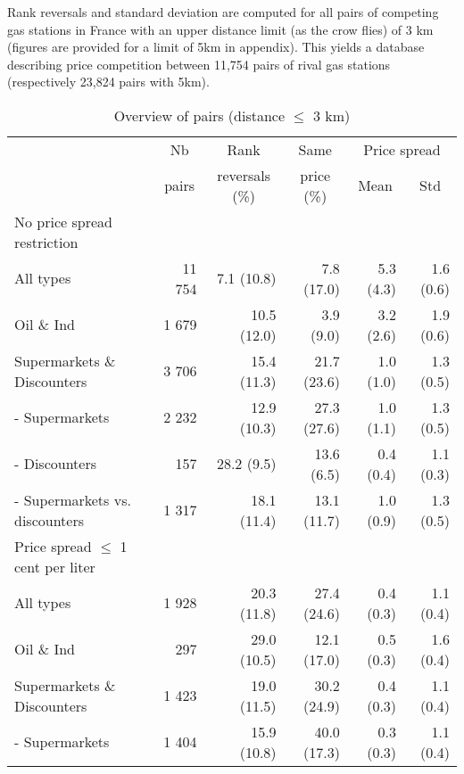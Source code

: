\documentclass[english]{article}
\begin{document}
Rank reversals and standard deviation are computed for all pairs of competing gas stations in France with an upper distance limit (as the crow flies) of 3 km (figures are provided for a limit of 5km in appendix). This yields a database describing price competition between 11,754 pairs of rival gas stations (respectively 23,824 pairs with 5km).

\begin{table}
\begin{threeparttable}
\renewcommand{\arraystretch}{0.8} %
\caption{Overview of pairs (distance $\le$ 3 km)}
\label{tab:stats_pair_rank_reversals}
    \begin{tabular}{lrrrrr}
    \toprule
    \toprule
          & \multicolumn{1}{c}{Nb} & \multicolumn{1}{c}{Rank} & \multicolumn{1}{c}{Same} & \multicolumn{2}{c}{Price spread} \\
          & \multicolumn{1}{c}{pairs} & \multicolumn{1}{c}{reversals (\%)} & \multicolumn{1}{c}{price (\%)} & \multicolumn{1}{c}{Mean} & \multicolumn{1}{c}{Std} \\
    \midrule
    No price spread restriction &       &       &       &       &  \\
    All types & 11 754 & 7.1 (10.8) & 7.8 (17.0) & 5.3 (4.3) & 1.6 (0.6) \\
    Oil \& Ind & 1 679 & 10.5 (12.0) & 3.9  (9.0) & 3.2 (2.6) & 1.9 (0.6) \\
    Supermarkets \& Discounters & 3 706 & 15.4 (11.3) & 21.7 (23.6) & 1.0 (1.0) & 1.3 (0.5) \\
    - Supermarkets & 2 232 & 12.9 (10.3) & 27.3 (27.6) & 1.0 (1.1) & 1.3 (0.5) \\
    - Discounters & 157   & 28.2 (9.5) & 13.6 (6.5) & 0.4 (0.4) & 1.1 (0.3) \\
    - Supermarkets vs. discounters & 1 317 & 18.1 (11.4) & 13.1 (11.7) & 1.0 (0.9) & 1.3 (0.5) \\
    \midrule
    Price spread $\le$ 1 cent per liter &       &       &       &       &  \\
    All types & 1 928 & 20.3 (11.8) & 27.4 (24.6) & 0.4 (0.3) & 1.1 (0.4) \\
    Oil \& Ind & 297   & 29.0 (10.5) & 12.1 (17.0) & 0.5 (0.3) & 1.6 (0.4) \\
    Supermarkets \& Discounters & 1 423 & 19.0 (11.5) & 30.2 (24.9) & 0.4 (0.3) & 1.1 (0.4) \\
    - Supermarkets & 1 404 & 15.9 (10.8) & 40.0 (17.3) & 0.3 (0.3) & 1.1 (0.4) \\

\end{tabular}
\end{threeparttable}
\end{table}
\end{document}
